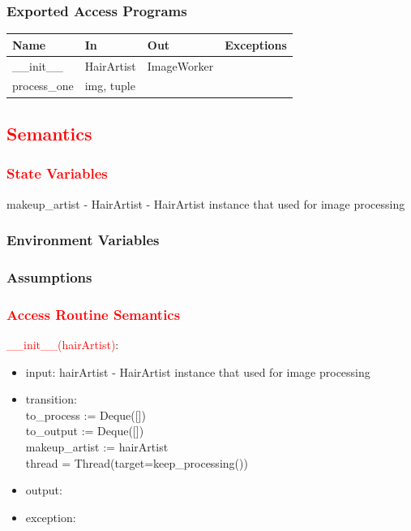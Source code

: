 \documentclass[12pt, titlepage]{article}
\begin{document}
\subsubsection{Exported Access Programs}

\begin{center}
\begin{tabular}{p{4cm} p{3cm} p{4cm} p{4cm}}
\hline
\textbf{Name} & \textbf{In} & \textbf{Out} & \textbf{Exceptions} \\
\hline
\_\_init\_\_ & HairArtist & ImageWorker & \\
process\_one & img, tuple & &  \\
\hline
\end{tabular}
\end{center}

\subsection{\textcolor{red}{Semantics}}

\subsubsection{\textcolor{red}{State Variables}}
makeup\_artist - HairArtist - HairArtist instance that used for image processing 

\subsubsection{Environment Variables}

\subsubsection{Assumptions}

\subsubsection{\textcolor{red}{Access Routine Semantics}}
\noindent 
\textcolor{red}{\_\_init\_\_(hairArtist)}:
\begin{itemize}
\item input: hairArtist - HairArtist instance that used for image processing  \\
\item transition: \\
to\_process := Deque([])\\ 
to\_output := Deque([]) \\
makeup\_artist := hairArtist \\
thread = Thread(target=keep\_processing())
\item output:
\item exception:
\end{itemize}
\end{document}
